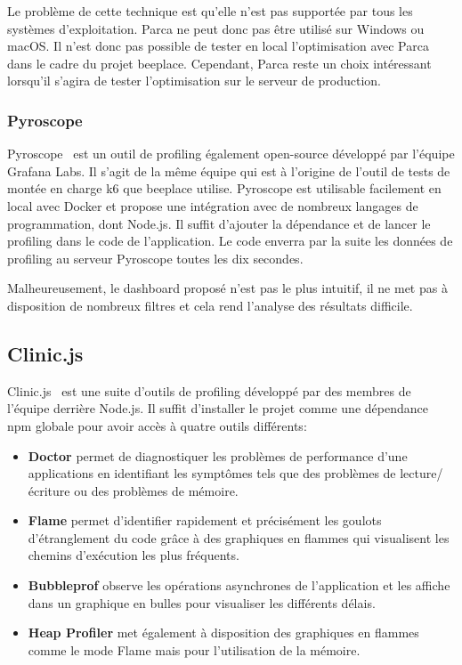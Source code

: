 Le problème de cette technique est qu'elle n'est pas supportée par tous les systèmes d'exploitation. Parca ne peut donc pas être utilisé sur Windows ou macOS. Il n'est donc pas possible de tester en local l'optimisation avec Parca dans le cadre du projet \gls{beeplace}. Cependant, Parca reste un choix intéressant lorsqu'il s'agira de tester l'optimisation sur le serveur de production.

\subsubsection{Pyroscope}

Pyroscope~\cite{pyroscope} est un outil de profiling également open-source développé par l'équipe Grafana Labs. Il s'agit de la même équipe qui est à l'origine de l'outil de tests de montée en charge k6 que \gls{beeplace} utilise. Pyroscope est utilisable facilement en local avec Docker et propose une intégration avec de nombreux langages de programmation, dont Node.js. Il suffit d'ajouter la dépendance et de lancer le profiling dans le code de l'application. Le code enverra par la suite les données de profiling au serveur Pyroscope toutes les dix secondes.

Malheureusement, le dashboard proposé n'est pas le plus intuitif, il ne met pas à disposition de nombreux filtres et cela rend l'analyse des résultats difficile.

\subsection{Clinic.js}

Clinic.js~\cite{clinicjs} est une suite d'outils de profiling développé par des membres de l'équipe derrière Node.js. Il suffit d'installer le projet comme une dépendance \gls{npm} globale pour avoir accès à quatre outils différents:

\begin{itemize}
  \item \textbf{Doctor} permet de diagnostiquer les problèmes de performance d'une applications en identifiant les symptômes tels que des problèmes de lecture/écriture ou des problèmes de mémoire.
  \item \textbf{Flame} permet d'identifier rapidement et précisément les goulots d'étranglement du code grâce à des graphiques en flammes qui visualisent les chemins d'exécution les plus fréquents.
  \item \textbf{Bubbleprof} observe les opérations asynchrones de l'application et les affiche dans un graphique en bulles pour visualiser les différents délais.
  \item \textbf{Heap Profiler} met également à disposition des graphiques en flammes comme le mode Flame mais pour l'utilisation de la mémoire.
\end{itemize}

